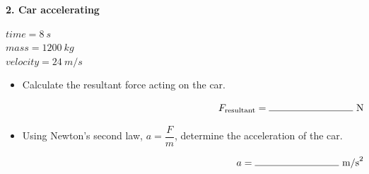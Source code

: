 \documentclass[12pt]{article}
\begin{document}
\vspace{1.2cm}

\noindent
\begin{minipage}[t]{0.48\textwidth}

\textbf{2. Car accelerating}

\vspace{0.5cm}
$time = \SI{8}{s}$ \\
$mass = \SI{1200}{kg}$ \\
$velocity = \SI{24}{m/s}$ \\

\vspace{0.5cm}

\begin{center}
\end{center}

\end{minipage}
\hfill
\begin{minipage}[t]{0.48\textwidth}

\begin{itemize}[label={}, leftmargin=*]
    \item Calculate the resultant force acting on the car.

    \vspace{2.0cm}
    \[
    \makebox[\linewidth][r]{$F_{\text{resultant}} = \rule{3cm}{0.4pt}\ \text{N}$}
    \]

    \item Using Newton’s second law, $a = \dfrac{F}{m}$, determine the acceleration of the car.

    \vspace{2.0cm}
    \[
    \makebox[\linewidth][r]{$a = \rule{3cm}{0.4pt}\ \text{m/s}^{2}$}
    \]
\end{itemize}

\end{minipage}

\vspace{1.2cm}
\end{document}
